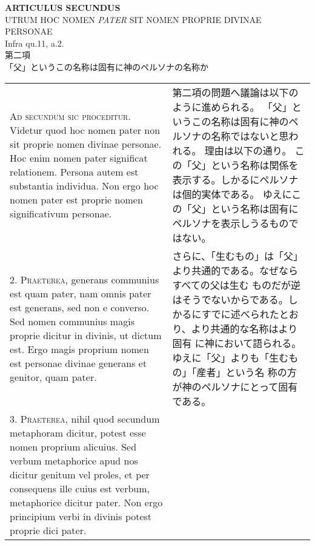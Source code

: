 \documentclass[10pt]{jsarticle} %
\begin{document}
\newpage




\begin{center}
{\Large {\bf ARTICULUS SECUNDUS}}\\
{\large UTRUM HOC NOMEN {\itshape PATER} SIT NOMEN PROPRIE DIVINAE PERSONAE}\\
{\footnotesize Infra qu.11, a.2.}\\
{\Large 第二項\\「父」というこの名称は固有に神のペルソナの名称か}
\end{center}

\begin{longtable}{p{21em}p{21em}}

{\scshape Ad secundum sic proceditur}. Videtur quod hoc nomen pater non sit
proprie nomen divinae personae. Hoc enim nomen pater significat
relationem. Persona autem est substantia individua. Non ergo hoc nomen
pater est proprie nomen significativum personae.

&

第二項の問題へ議論は以下のように進められる。
「父」というこの名称は固有に神のペルソナの名称ではないと思われる。
理由は以下の通り。
この「父」という名称は関係を表示する。しかるにペルソナは個的実体である。
 ゆえにこの「父」という名称は固有にペルソナを表示しうるものではない。

\\



2. {\scshape Praeterea}, generans communius est quam pater, nam omnis pater est
generans, sed non e converso. Sed nomen communius magis proprie
dicitur in divinis, ut dictum est. Ergo magis proprium nomen est
personae divinae generans et genitor, quam pater.

&

さらに、「生むもの」は「父」より共通的である。なぜならすべての父は生む
 ものだが逆はそうでないからである。しかるにすでに述べられたとおり、より共通的な名称はより固有
 に神において語られる。ゆえに「父」よりも「生むもの」「産者」という名
 称の方が神のペルソナにとって固有である。

\\



3. {\scshape Praeterea}, nihil quod secundum metaphoram dicitur, potest esse nomen
proprium alicuius. Sed verbum metaphorice apud nos dicitur genitum vel
proles, et per consequens ille cuius est verbum, metaphorice dicitur
pater. Non ergo principium verbi in divinis potest proprie dici pater.


\end{longtable}
\end{document}
